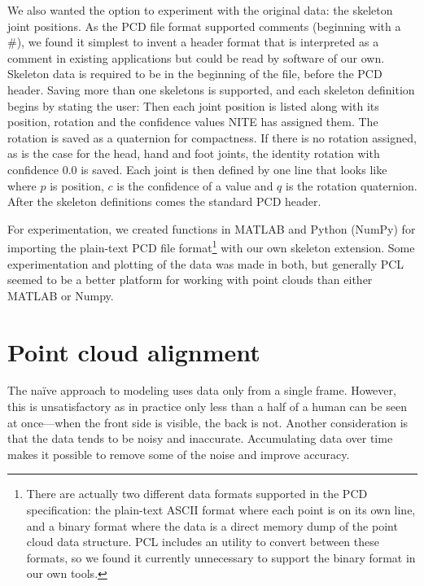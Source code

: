 We also wanted the option to experiment with the original data: the skeleton joint positions. As the PCD file format supported comments (beginning with a \#), we found it simplest to invent a header format that is interpreted as a comment in existing applications but could be read by software of our own. Skeleton data is required to be in the beginning of the file, before the PCD header. Saving more than one skeletons is supported, and each skeleton definition begins by stating the user:
%
%
Then each joint position is listed along with its position, rotation and the confidence values NITE has assigned them. The rotation is saved as a quaternion for compactness. If there is no rotation assigned, as is the case for the head, hand and foot joints, the identity rotation with confidence 0.0 is saved. Each joint is then defined by one line that looks like
%
%
where $p$ is position, $c$ is the confidence of a value and $q$ is the rotation quaternion. After the skeleton definitions comes the standard PCD header.


For experimentation, we created functions in MATLAB and Python (NumPy) for importing the plain-text PCD file format\footnote{There are actually two different data formats supported in the PCD specification: the plain-text ASCII format where each point is on its own line, and a binary format where the data is a direct memory dump of the point cloud data structure. PCL includes an utility to convert between these formats, so we found it currently unnecessary to support the binary format in our own tools.} with our own skeleton extension. Some experimentation and plotting of the data was made in both, but generally PCL seemed to be a better platform for working with point clouds than either MATLAB or Numpy.

\section{Point cloud alignment}

The naïve approach to modeling uses data only from a single frame. However, this is unsatisfactory as in practice only less than a half of a human can be seen at once---when the front side is visible, the back is not. Another consideration is that the data tends to be noisy and inaccurate. Accumulating data over time makes it possible to remove some of the noise and improve accuracy.

